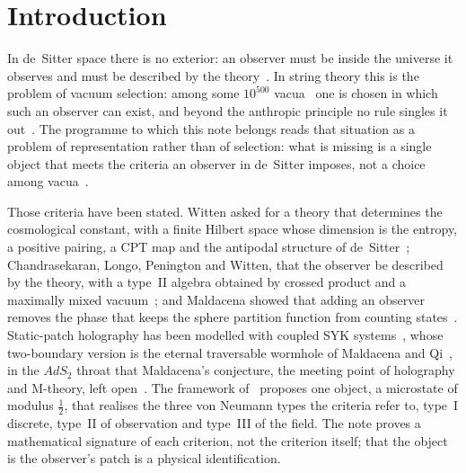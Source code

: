 \documentclass[11pt,reqno]{amsart}
\numberwithin{equation}{section}
\theoremstyle{remark}
\begin{document}

\maketitle

\tableofcontents

\section{Introduction}\label{sec:intro}

In de~Sitter space there is no exterior: an observer must be inside the universe it observes and
must be described by the theory~\cite{Wit01,BF01,CLPW23}. In string theory this is the problem of
vacuum selection: among some $10^{500}$ vacua~\cite{BP00} one is chosen in which such an observer can
exist, and beyond the anthropic principle no rule singles it out~\cite{CW6}. The programme to which
this note belongs reads that situation as a problem of representation rather than of selection:
what is missing is a single object that meets the criteria an observer in de~Sitter imposes, not a
choice among vacua~\cite{PRES}.

Those criteria have been stated. Witten asked for a theory that determines the cosmological
constant, with a finite Hilbert space whose dimension is the entropy, a positive pairing, a CPT map
and the antipodal structure of de~Sitter~\cite{Wit01}; Chandrasekaran, Longo, Penington and Witten,
that the observer be described by the theory, with a type~II algebra obtained by crossed product and
a maximally mixed vacuum~\cite{CLPW23}; and Maldacena showed that adding an observer removes the
phase that keeps the sphere partition function from counting states~\cite{Mal24}. Static-patch
holography has been modelled with coupled SYK systems~\cite{Sus21,NV25}, whose two-boundary version is
the eternal traversable wormhole of Maldacena and Qi~\cite{MQ18}, in the $AdS_2$ throat that
Maldacena's conjecture, the meeting point of holography and M-theory, left open~\cite{Mal98}. The
framework of~\cite{CW6} proposes one object, a microstate of modulus $\tfrac12$, that realises the
three von Neumann types the criteria refer to, type~I discrete, type~II of observation and type~III
of the field. The note proves a mathematical signature of each criterion, not the criterion
itself; that the object is the observer's patch is a physical identification.
\end{document}
